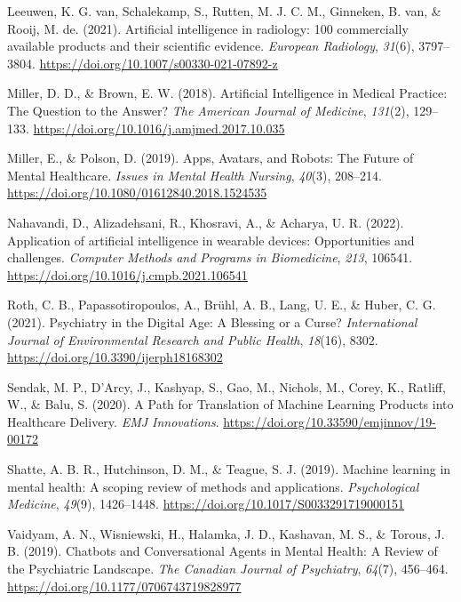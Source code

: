 \documentclass[
  man]{apa7}
\newlength{\cslhangindent}
\newlength{\cslentryspacingunit} %
\newenvironment{CSLReferences}[2] %
 {%
  \setlength{\parindent}{0pt}
  \ifodd #1
  \let\oldpar\par
  \def\par{\hangindent=\cslhangindent\oldpar}
  \fi
  \setlength{\parskip}{#2\cslentryspacingunit}
 }%
 {}
\begin{document}
\begin{CSLReferences}{1}{0}
\leavevmode{}%
Leeuwen, K. G. van, Schalekamp, S., Rutten, M. J. C. M., Ginneken, B. van, \& Rooij, M. de. (2021). Artificial intelligence in radiology: 100 commercially available products and their scientific evidence. \emph{European Radiology}, \emph{31}(6), 3797--3804. \url{https://doi.org/10.1007/s00330-021-07892-z}

\leavevmode{}%
Miller, D. D., \& Brown, E. W. (2018). Artificial {Intelligence} in {Medical} {Practice}: {The} {Question} to the {Answer}? \emph{The American Journal of Medicine}, \emph{131}(2), 129--133. \url{https://doi.org/10.1016/j.amjmed.2017.10.035}

\leavevmode{}%
Miller, E., \& Polson, D. (2019). Apps, {Avatars}, and {Robots}: {The} {Future} of {Mental} {Healthcare}. \emph{Issues in Mental Health Nursing}, \emph{40}(3), 208--214. \url{https://doi.org/10.1080/01612840.2018.1524535}

\leavevmode{}%
Nahavandi, D., Alizadehsani, R., Khosravi, A., \& Acharya, U. R. (2022). Application of artificial intelligence in wearable devices: {Opportunities} and challenges. \emph{Computer Methods and Programs in Biomedicine}, \emph{213}, 106541. \url{https://doi.org/10.1016/j.cmpb.2021.106541}

\leavevmode{}%
Roth, C. B., Papassotiropoulos, A., Brühl, A. B., Lang, U. E., \& Huber, C. G. (2021). Psychiatry in the {Digital} {Age}: {A} {Blessing} or a {Curse}? \emph{International Journal of Environmental Research and Public Health}, \emph{18}(16), 8302. \url{https://doi.org/10.3390/ijerph18168302}

\leavevmode{}%
Sendak, M. P., D'Arcy, J., Kashyap, S., Gao, M., Nichols, M., Corey, K., Ratliff, W., \& Balu, S. (2020). A {Path} for {Translation} of {Machine} {Learning} {Products} into {Healthcare} {Delivery}. \emph{EMJ Innovations}. \url{https://doi.org/10.33590/emjinnov/19-00172}

\leavevmode{}%
Shatte, A. B. R., Hutchinson, D. M., \& Teague, S. J. (2019). Machine learning in mental health: A scoping review of methods and applications. \emph{Psychological Medicine}, \emph{49}(9), 1426--1448. \url{https://doi.org/10.1017/S0033291719000151}

\leavevmode{}%
Vaidyam, A. N., Wisniewski, H., Halamka, J. D., Kashavan, M. S., \& Torous, J. B. (2019). Chatbots and {Conversational} {Agents} in {Mental} {Health}: {A} {Review} of the {Psychiatric} {Landscape}. \emph{The Canadian Journal of Psychiatry}, \emph{64}(7), 456--464. \url{https://doi.org/10.1177/0706743719828977}

\end{CSLReferences}
\end{document}

